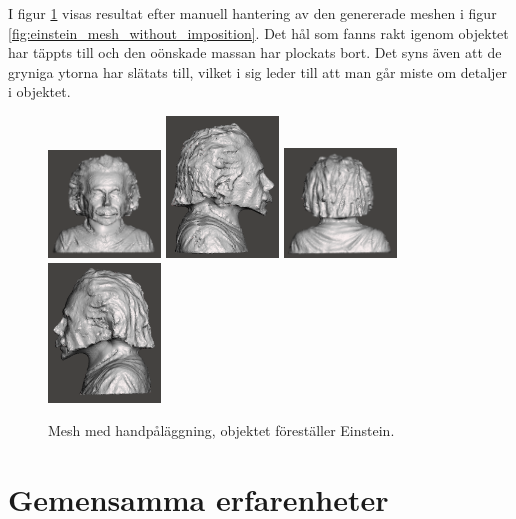 I figur \ref{fig:einstein_mesh_with_imposition} visas resultat efter manuell hantering av den genererade meshen i figur \ref{fig:einstein_mesh_without_imposition}. Det hål som fanns rakt igenom objektet har täppts till och den oönskade massan har plockats bort. Det syns även att de gryniga ytorna har slätats till, vilket i sig leder till att man går miste om detaljer i objektet.

\begin{figure}[H]
	\centering
	\includegraphics[width=30mm]{figures/ein_mesh_with_imposition1.png}
	\includegraphics[width=30mm]{figures/ein_mesh_with_imposition2.png}
	\includegraphics[width=30mm]{figures/ein_mesh_with_imposition3.png}
	\includegraphics[width=30mm]{figures/ein_mesh_with_imposition4.png}
	\caption{Mesh med handpåläggning, objektet föreställer Einstein.}
	\label{fig:einstein_mesh_with_imposition}
\end{figure}


\section{Gemensamma erfarenheter}
\label{cha:results_experiences}

